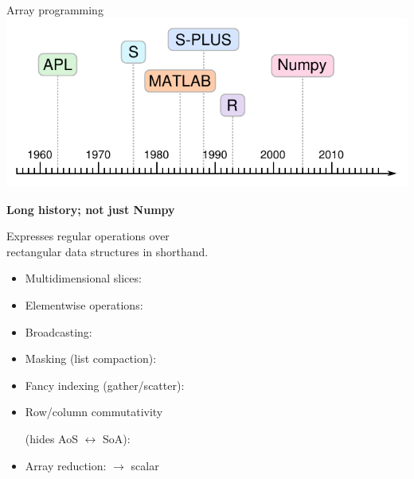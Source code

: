 \documentclass[aspectratio=169]{beamer}
\begin{document}
\begin{frame}[fragile]{Array programming}
\vspace{0.2 cm}
\hfill \includegraphics[height=2.75 cm]{apl-timeline.pdf}

\vspace{-2.15 cm}
{\bf\large Long history; not just Numpy}

\vspace{0.5 cm}
Expresses regular operations over \\ rectangular data structures in shorthand.

\vspace{0.25 cm}
\begin{itemize}\setlength{\itemsep}{0.15 cm}
\item<2-> Multidimensional slices: 
\item<3-> Elementwise operations: 
\item<4-> Broadcasting: 
\item<5-> Masking (list compaction): 
\item<6-> Fancy indexing (gather/scatter): 
\item<7-> Row/column commutativity 

(hides AoS $\leftrightarrow$ SoA): 
\item<8-> Array reduction:  $\to$ scalar
\end{itemize}
\end{frame}
\end{document}
